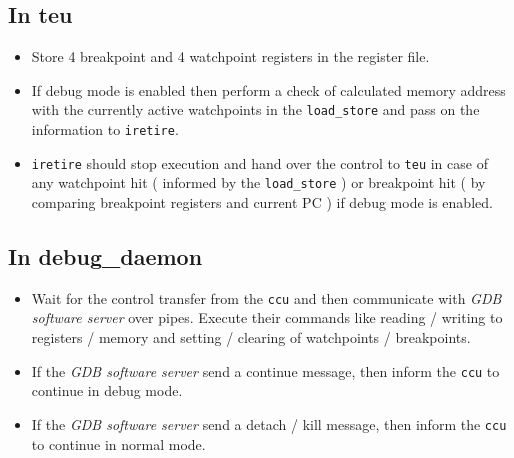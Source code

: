 \documentclass[a4paper, 11pt]{article}
\begin{document}
\subsection*{In teu}
\begin{itemize}
\item Store 4 breakpoint and 4 watchpoint registers in the register file.

\item If debug mode is enabled then perform a check of calculated memory address with the currently active watchpoints in the \texttt{load\_store} and pass on the information to \texttt{iretire}.

\item \texttt{iretire} should stop execution and hand over the control to \texttt{teu} in case of any watchpoint hit ( informed by the \texttt{load\_store} ) or breakpoint hit ( by comparing breakpoint registers and current PC ) if debug mode is enabled.
\end{itemize}

\subsection*{In debug\_daemon}
\begin{itemize}
\item Wait for the control transfer from the \texttt{ccu} and then communicate with \textit{GDB software server} over pipes. Execute their commands like reading / writing to registers / memory and setting / clearing of watchpoints / breakpoints.

\item If the \textit{GDB software server} send a continue message, then inform the \texttt{ccu} to continue in debug mode.

\item If the \textit{GDB software server} send a detach / kill message, then inform the \texttt{ccu} to continue in normal mode.
\end{itemize}
\end{document}
